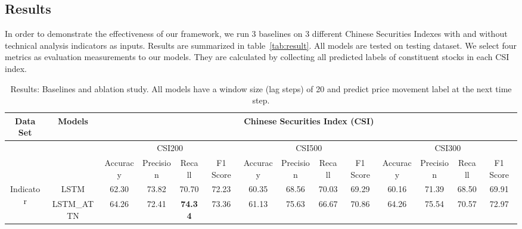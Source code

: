 \documentclass[sigconf, anonymous, review]{acmart}
\begin{document}
\subsection{Results}
\label{sec:res}

In order to demonstrate the effectiveness of our framework, we
run 3 baselines on 3 different Chinese Securities Indexes with
and without technical analysis indicators as inputs. Results are
summarized in table~\ref{tab:result}. All models are tested on
testing dataset. We select four metrics as evaluation
measurements to our models. They are calculated by collecting all
predicted labels of constituent stocks in each CSI index.

\begin{table}[t]
\centering
\small
\setlength\tabcolsep{2pt}
\caption{Results: Baselines and ablation study. All models have a
  window size (lag steps) of 20 and predict price movement label
  at the next time step.}
\begin{tabular}{@{}cccccccccccccc@{}}
\toprule
Data Set                   & Models                          & \multicolumn{12}{c}{Chinese Securities Index (CSI)}                                                                                                                                                                                                    \\ \midrule
\multicolumn{2}{c}{\multirow{2}{*}{}}                        & \multicolumn{4}{c}{CSI200}                                                                & \multicolumn{4}{c}{CSI500}                                                             & \multicolumn{4}{c}{CSI300}                                        \\
\multicolumn{2}{c}{}                                         & Accuracy                   & Precision      & Recall         & F1 Score                   & Accuracy       & Precision      & Recall         & F1 Score                            & Accuracy       & Precision      & Recall         & F1 Score       \\ \cmidrule(r){1-2} \cmidrule(lr){4-5} \cmidrule(lr){8-9} \cmidrule(lr){12-13}
\multirow{3}{*}{Indicator} & LSTM                            & 62.30                      & 73.82          & 70.70          & 72.23                      & 60.35          & 68.56          & 70.03          & 69.29                               & 60.16          & 71.39          & 68.50          & 69.91          \\
                           & \multicolumn{1}{c|}{LSTM\_ATTN} & 64.26                      & 72.41          & \textbf{74.34} & \multicolumn{1}{c|}{73.36} & 61.13          & 75.63          & 66.67          & \multicolumn{1}{c|}{70.86}          & 64.26          & 75.54          & 70.57          & 72.97          \\

\end{tabular}
\end{table}
\end{document}
